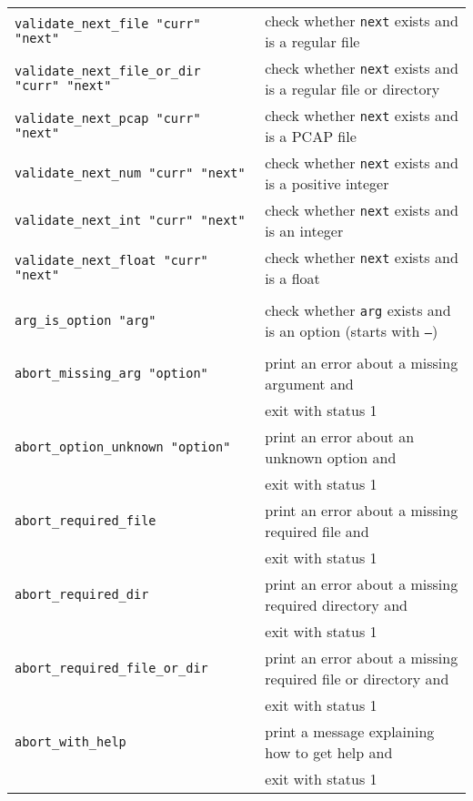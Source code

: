 \documentclass[documentation]{subfiles}
\begin{document}
\begin{longtable}{>{\tt}ll}
    validate\_next\_file          "curr" "next" & check whether {\tt next} exists and is a regular file\\
    validate\_next\_file\_or\_dir "curr" "next" & check whether {\tt next} exists and is a regular file or directory\\
    validate\_next\_pcap          "curr" "next" & check whether {\tt next} exists and is a PCAP file\\
    validate\_next\_num           "curr" "next" & check whether {\tt next} exists and is a positive integer\\
    validate\_next\_int           "curr" "next" & check whether {\tt next} exists and is an integer\\
    validate\_next\_float         "curr" "next" & check whether {\tt next} exists and is a float\\
                                                & \\
    arg\_is\_option "arg"                       & check whether {\tt arg} exists and is an option (starts with {\tt --})\\
                                                & \\
    abort\_missing\_arg "option"                & print an error about a missing argument and\\
                                                & \qquad exit with status 1\\
    abort\_option\_unknown "option"             & print an error about an unknown option and\\
                                                & \qquad exit with status 1\\
    abort\_required\_file                       & print an error about a missing required file and\\
                                                & \qquad exit with status 1\\
    abort\_required\_dir                        & print an error about a missing required directory and\\
                                                & \qquad exit with status 1\\
    abort\_required\_file\_or\_dir              & print an error about a missing required file or directory and\\
                                                & \qquad exit with status 1\\
    abort\_with\_help                           & print a message explaining how to get help and\\
                                                & \qquad exit with status 1\\
    \bottomrule
\end{longtable}
\end{document}
